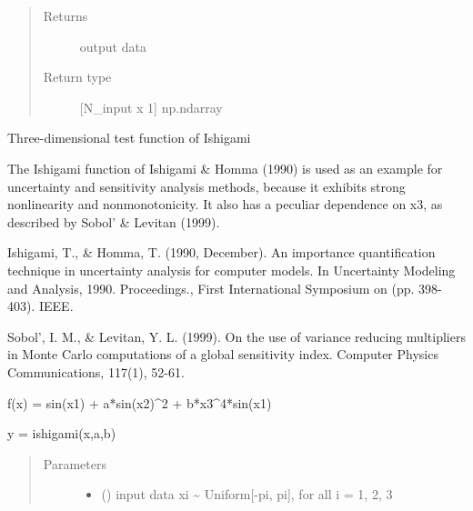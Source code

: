\documentclass[letterpaper,10pt,english,openany,oneside]{sphinxmanual}
\begin{document}
\begin{fulllineitems}
\begin{quote}
\begin{description}
\begin{itemize}
\end{itemize}

\item[{Returns}] \leavevmode
{} \textendash{} output data

\item[{Return type}] \leavevmode
{[}N\_input x 1{]} np.ndarray

\end{description}\end{quote}

\end{fulllineitems}


\begin{fulllineitems}
\label{\detokenize{pygpc:pygpc.testfun.ishigami}}
Three-dimensional test function of Ishigami

The Ishigami function of Ishigami \& Homma (1990) is used as an example
for uncertainty and sensitivity analysis methods, because it exhibits
strong nonlinearity and nonmonotonicity. It also has a peculiar
dependence on x3, as described by Sobol’ \& Levitan (1999).

Ishigami, T., \& Homma, T. (1990, December). An importance quantification
technique in uncertainty analysis for computer models. In Uncertainty
Modeling and Analysis, 1990. Proceedings., First International Symposium
on (pp. 398-403). IEEE.

Sobol’, I. M., \& Levitan, Y. L. (1999). On the use of variance reducing
multipliers in Monte Carlo computations of a global sensitivity index.
Computer Physics Communications, 117(1), 52-61.

f(x) = sin(x1) + a*sin(x2)\textasciicircum{}2 + b*x3\textasciicircum{}4*sin(x1)

y = ishigami(x,a,b)
\begin{quote}\begin{description}
\item[{Parameters}] \leavevmode\begin{itemize}
\item {} 
 (\sphinxstyleliteralemphasis{\sphinxupquote{{[}}}\sphinxstyleliteralemphasis{\sphinxupquote{{]} }}) \textendash{} input data
xi \textasciitilde{} Uniform{[}-pi, pi{]}, for all i = 1, 2, 3


\end{itemize}
\end{description}
\end{quote}
\end{fulllineitems}
\end{document}
